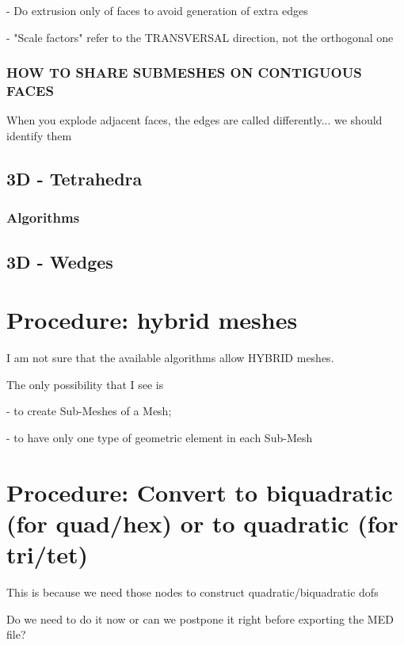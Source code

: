 \documentclass[10pt]{book}
\begin{document}
 
 - Do extrusion only of faces to avoid generation of extra edges    

  - "Scale factors" refer to the TRANSVERSAL direction, not the orthogonal one



\subsection{HOW TO SHARE SUBMESHES ON CONTIGUOUS FACES}


When you explode adjacent faces, the edges are called differently... we should identify them

 
 
  \section{3D - Tetrahedra}
  
   \subsection{Algorithms}
   
   
   

  \section{3D - Wedges}
  
 
  \chapter{Procedure: hybrid meshes}
  
  I am not sure that the available algorithms allow HYBRID meshes.
  
  The only possibility that I see is 
  
  - to create Sub-Meshes of a Mesh;
  
  - to have only one type of geometric element in each Sub-Mesh
  

 
 
  \chapter{Procedure: Convert to biquadratic (for quad/hex) or to quadratic (for tri/tet)}
  
  This is because we need those nodes to construct quadratic/biquadratic dofs
  
  Do we need to do it now or can we postpone it right before exporting the MED file?
  
\end{document}
